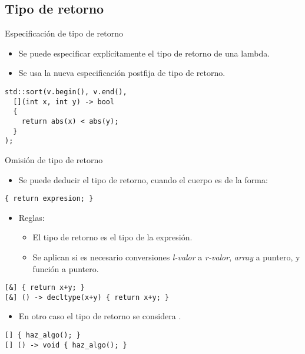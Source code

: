\subsection{Tipo de retorno}

\begin{frame}[t,fragile]{Especificación de tipo de retorno}
  \begin{itemize}
    \item Se puede especificar explícitamente el tipo de retorno de una lambda.
    \item Se usa la nueva especificación postfija de tipo de retorno.
  \end{itemize}
\pause
\begin{lstlisting}
std::sort(v.begin(), v.end(), 
  [](int x, int y) -> bool
  { 
    return abs(x) < abs(y); 
  }
);
\end{lstlisting}
\end{frame}

\begin{frame}[t,fragile]{Omisión de tipo de retorno}
  \begin{itemize}
    \item Se puede deducir el tipo de retorno, cuando el cuerpo es de la forma:
  \end{itemize}
\begin{lstlisting}
{ return expresion; }
\end{lstlisting}
\pause
  \begin{itemize}
    \item Reglas:
    \begin{itemize}
      \item El tipo de retorno es el tipo de la expresión.
      \item Se aplican si es necesario conversiones \emph{l-valor} a \emph{r-valor}, \emph{array} a puntero, y función a puntero.
    \end{itemize}
  \end{itemize}
\begin{lstlisting}
[&] { return x+y; }
[&] () -> decltype(x+y) { return x+y; }
\end{lstlisting}
\pause
  \begin{itemize}
    \item En otro caso el tipo de retorno se considera .
  \end{itemize}
\begin{lstlisting}
[] { haz_algo(); }
[] () -> void { haz_algo(); }
\end{lstlisting}
\end{frame}

